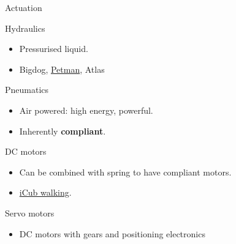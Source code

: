 \documentclass[compress]{beamer}
\begin{document}
\begin{frame}{Actuation}

    Hydraulics

    \begin{itemize}

        \item Pressurised liquid.
        \item Bigdog, \href{http://www.youtube.com/watch?v=QRbvNL1PHKg}{Petman}, Atlas
    \end{itemize}

    Pneumatics

    \begin{itemize}

        \item Air powered: high energy, powerful.
        \item Inherently \textbf{compliant}.
    \end{itemize}

    DC motors

    \begin{itemize}

        \item Can be combined with spring to have compliant motors.
        \item \href{http://www.youtube.com/watch?v=XVYsqv3sLew}{iCub walking}.
    \end{itemize}

    Servo motors

    \begin{itemize}

        \item DC motors with gears and positioning electronics
    \end{itemize}

\end{frame}
\end{document}

